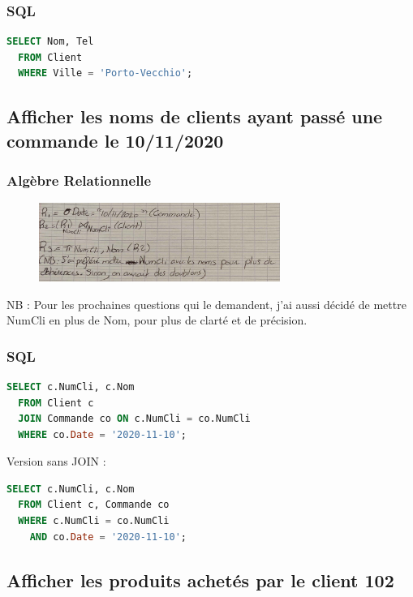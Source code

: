 \documentclass{article}
\begin{document}
\subsubsection{SQL}

\begin{lstlisting}[language=SQL]
  SELECT Nom, Tel 
  FROM Client 
  WHERE Ville = 'Porto-Vecchio';
\end{lstlisting}

\subsection{Afficher les noms de clients ayant passé une commande le 10/11/2020}

\subsubsection{Algèbre Relationnelle}

\begin{figure}[H]
  \centering
  \includegraphics[width=0.7\textwidth]{alg/4.png}
  \label{fig:alg-rel}
\end{figure}

NB : Pour les prochaines questions qui le demandent, j'ai aussi décidé de mettre NumCli en plus de Nom, pour plus de clarté et de précision.

\subsubsection{SQL}

\begin{lstlisting}[language=SQL]
  SELECT c.NumCli, c.Nom 
  FROM Client c
  JOIN Commande co ON c.NumCli = co.NumCli
  WHERE co.Date = '2020-11-10';
\end{lstlisting}

Version sans JOIN :

\begin{lstlisting}[language=SQL]
  SELECT c.NumCli, c.Nom 
  FROM Client c, Commande co 
  WHERE c.NumCli = co.NumCli 
    AND co.Date = '2020-11-10';
\end{lstlisting}

\subsection{Afficher les produits achetés par le client 102}
\end{document}
